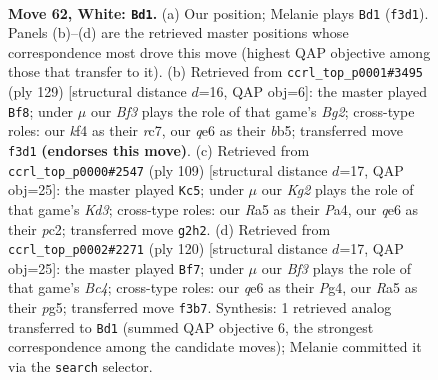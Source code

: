 \documentclass[11pt]{article}
\begin{document}
\clearpage

\begin{figure}[p]\centering
\begin{subfigure}{0.46\textwidth}\centering
\resizebox{\linewidth}{!}{%
\newchessgame
\chessboard[
  setfen={8/8/4q3/R7/1p3k2/b4B2/6K1/8 w - - 14 62},
  showmover=false,
  pgfstyle=straightmove, color=movearrow, markmove={f3-d1}
]}
\caption{}
\end{subfigure}\hfill
\begin{subfigure}{0.46\textwidth}\centering
\resizebox{\linewidth}{!}{%
\newchessgame
\chessboard[
  setfen={8/2R3b1/5k2/1B6/3r4/5K2/P7/8 b - - 7 65},
  showmover=false,
  pgfstyle=straightmove, color=movearrow, markmove={g7-f8}
]}
\caption{}
\end{subfigure}
\\[4pt]
\begin{subfigure}{0.46\textwidth}\centering
\resizebox{\linewidth}{!}{%
\newchessgame
\chessboard[
  setfen={8/8/B2k4/4bK1P/p7/8/2P5/8 b - - 1 55},
  showmover=false,
  pgfstyle=straightmove, color=movearrow, markmove={d6-c5}
]}
\caption{}
\end{subfigure}\hfill
\begin{subfigure}{0.46\textwidth}\centering
\resizebox{\linewidth}{!}{%
\newchessgame
\chessboard[
  setfen={8/2b3p1/8/2k3p1/2B3P1/3K4/8/8 w - - 12 61},
  showmover=false,
  pgfstyle=straightmove, color=movearrow, markmove={c4-f7}
]}
\caption{}
\end{subfigure}
\caption{\textbf{Move 62, White: \texttt{Bd1}.} (a) Our position; Melanie plays \texttt{Bd1} (\texttt{f3d1}). Panels (b)--(d) are the retrieved master positions whose correspondence most drove this move (highest QAP objective among those that transfer to it). (b) Retrieved from \texttt{ccrl\_top\_p0001\#3495} (ply 129) [structural distance $d$=16, QAP obj=6]: the master played \texttt{Bf8}; under $\mu$ our \emph{Bf3} plays the role of that game's \emph{Bg2}; cross-type roles: our \emph{k}f4 as their \emph{r}c7, our \emph{q}e6 as their \emph{b}b5; transferred move \texttt{f3d1} \textbf{(endorses this move)}. (c) Retrieved from \texttt{ccrl\_top\_p0000\#2547} (ply 109) [structural distance $d$=17, QAP obj=25]: the master played \texttt{Kc5}; under $\mu$ our \emph{Kg2} plays the role of that game's \emph{Kd3}; cross-type roles: our \emph{R}a5 as their \emph{P}a4, our \emph{q}e6 as their \emph{p}c2; transferred move \texttt{g2h2}. (d) Retrieved from \texttt{ccrl\_top\_p0002\#2271} (ply 120) [structural distance $d$=17, QAP obj=25]: the master played \texttt{Bf7}; under $\mu$ our \emph{Bf3} plays the role of that game's \emph{Bc4}; cross-type roles: our \emph{q}e6 as their \emph{P}g4, our \emph{R}a5 as their \emph{p}g5; transferred move \texttt{f3b7}. Synthesis: 1 retrieved analog transferred to \texttt{Bd1} (summed QAP objective 6, the strongest correspondence among the candidate moves); Melanie committed it via the \texttt{search} selector.}
\label{fig:thought-m122}
\end{figure}
\end{document}

